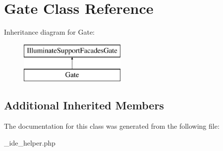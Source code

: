 \hypertarget{class_gate}{}\section{Gate Class Reference}
\label{class_gate}
Inheritance diagram for Gate\+:\begin{figure}[H]
\begin{center}
\leavevmode
\includegraphics[height=2.000000cm]{class_gate}
\end{center}
\end{figure}
\subsection*{Additional Inherited Members}


The documentation for this class was generated from the following file\+:\begin{DoxyCompactItemize}
\item 
\+\_\+ide\+\_\+helper.\+php\end{DoxyCompactItemize}
